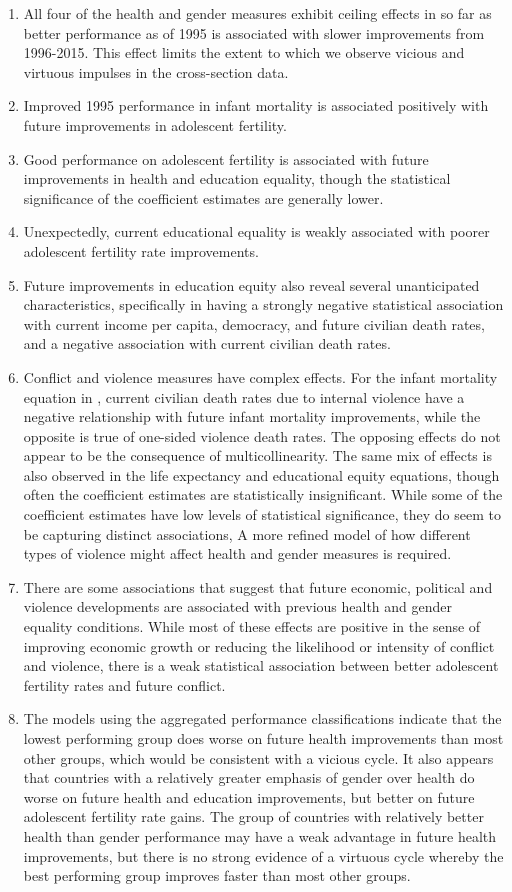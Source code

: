 \documentclass[12pt]{article}
\begin{document}
\begin{enumerate}
\item All four of the health and gender measures exhibit ceiling effects in so far as better performance as of 1995 is associated with slower improvements from 1996-2015. This effect limits the extent to which we observe vicious and virtuous impulses in the cross-section data.
\item Improved 1995 performance in infant mortality is associated positively with future improvements in adolescent fertility.
\item Good performance on adolescent fertility  is associated with future improvements in health and education equality, though the statistical significance of the coefficient estimates are generally lower.
\item Unexpectedly, current educational equality is weakly associated with poorer adolescent fertility rate improvements.
\item Future improvements in education equity also reveal several unanticipated characteristics, specifically in having a strongly negative statistical association with current income per capita, democracy, and future civilian death rates, and a negative association with current civilian death rates.
\item Conflict and violence measures have complex effects. For the infant mortality equation in , current civilian death rates due to internal violence have a negative relationship with future infant mortality improvements, while the opposite is true of one-sided violence death rates. The opposing effects do not appear to be the consequence of multicollinearity. The same mix of effects is also observed in the life expectancy and educational equity equations, though often the coefficient estimates are statistically insignificant. While some of the coefficient estimates have low levels of statistical significance, they do seem to be capturing distinct associations, A more refined model of how different types of violence might affect health and gender measures is required.
\item There are some associations that suggest that future economic, political and violence developments are associated with previous health and gender equality conditions. While most of these effects are positive in the sense of improving economic growth or reducing the likelihood or intensity of conflict and violence, there is a weak statistical association between better adolescent fertility rates and future conflict.
\item The models using the aggregated performance classifications indicate that the lowest performing group does worse on future health improvements than most other groups, which would be consistent with a vicious cycle. It also appears that countries with a relatively greater emphasis of gender over health do worse on future health and education improvements, but better on future adolescent fertility rate gains. The group of countries with relatively better health than gender performance may have a weak advantage in future health improvements, but there is no strong evidence of a virtuous cycle whereby the best performing group improves faster than most other groups.

\end{enumerate}
\end{document}
